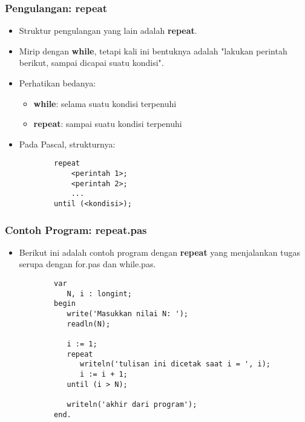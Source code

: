 \documentclass{beamer}
\begin{document}
\begin{frame}[fragile]
\frametitle{Pengulangan: repeat}
\begin{itemize}
	\item Struktur pengulangan yang lain adalah \textbf{repeat}.
	\item Mirip dengan \textbf{while}, tetapi kali ini bentuknya adalah "lakukan perintah berikut, sampai dicapai suatu kondisi".
	\item Perhatikan bedanya:
	\begin{itemize}
		\item \textbf{while}: selama suatu kondisi terpenuhi
		\item \textbf{repeat}: sampai suatu kondisi terpenuhi
	\end{itemize}
	\item Pada Pascal, strukturnya:
	\begin{lstlisting}
		repeat
		    <perintah 1>;
		    <perintah 2>;
		    ...
		until (<kondisi>);
	\end{lstlisting}
\end{itemize}
\end{frame}

\begin{frame}[fragile]
\frametitle{Contoh Program: repeat.pas}
\begin{itemize}
	\item Berikut ini adalah contoh program dengan \textbf{repeat} yang menjalankan tugas serupa dengan for.pas dan while.pas.
	\begin{lstlisting}
		var
		   N, i : longint;
		begin
		   write('Masukkan nilai N: ');
		   readln(N);
		
		   i := 1;
		   repeat
		      writeln('tulisan ini dicetak saat i = ', i);
		      i := i + 1;
		   until (i > N);
		
		   writeln('akhir dari program');
		end.
	\end{lstlisting}
\end{itemize}
\end{frame}
\end{document}
